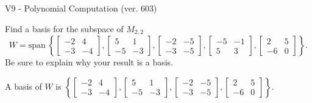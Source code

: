 \begin{exercise}
  \begin{exerciseTitle}V9 - Polynomial Computation (ver. 603)\end{exerciseTitle}
  \begin{exerciseStatement}
    Find a basis for the subspace of \(M_{2,2}\) 
\[W=\mathrm{span}\ \left\{\left[\begin{array}{cc}
-2 & 4 \\
-3 & -4
\end{array}\right] , \left[\begin{array}{cc}
5 & 1 \\
-5 & -3
\end{array}\right] , \left[\begin{array}{cc}
-2 & -5 \\
-3 & -5
\end{array}\right] , \left[\begin{array}{cc}
-5 & -1 \\
5 & 3
\end{array}\right] , \left[\begin{array}{cc}
2 & 5 \\
-6 & 0
\end{array}\right]\right\}.\]
 Be sure to explain why your result is a basis.


  \end{exerciseStatement}
  \begin{exerciseAnswer}
   A basis of \(W\) is  \(\left\{\left[\begin{array}{cc}
-2 & 4 \\
-3 & -4
\end{array}\right] , \left[\begin{array}{cc}
5 & 1 \\
-5 & -3
\end{array}\right] , \left[\begin{array}{cc}
-2 & -5 \\
-3 & -5
\end{array}\right] , \left[\begin{array}{cc}
2 & 5 \\
-6 & 0
\end{array}\right]\right\}\).
  


  \end{exerciseAnswer}
\end{exercise}